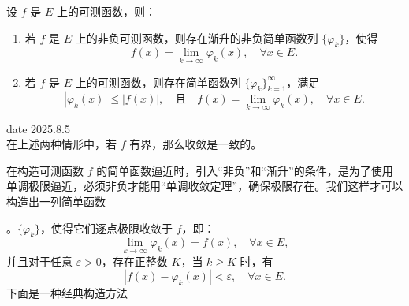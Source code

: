 \documentclass[lang=cn,10pt]{elegantbook}
\begin{document}
\begin{theorem}[可测函数是简单函数的极限]
设 $f$ 是 $E$ 上的可测函数，则：

\begin{enumerate}[(1)]
    \item 若 $f$ 是 $E$ 上的非负可测函数，则存在渐升的非负简单函数列 $\{\varphi_k\}$，使得
    \[
    f(x) = \lim_{k \to \infty} \varphi_k(x), \quad \forall x \in E.
    \]

    \item 若 $f$ 是 $E$ 上的可测函数，则存在简单函数列 $\{\varphi_k\}_{k=1}^\infty$，满足
    \[
    |\varphi_k(x)| \leq |f(x)|, \quad \text{且} \quad f(x) = \lim_{k \to \infty} \varphi_k(x), \quad \forall x \in E.
    \]
\end{enumerate}
date 2025.8.5\\
在上述两种情形中，若 $f$ 有界，那么收敛是一致的。
\end{theorem}
\begin{dxtips}
    

    
在构造可测函数 $f$ 的简单函数逼近时，引入“非负”和“渐升”的条件，是为了使用单调极限逼近，必须非负才能用“单调收敛定理”，确保极限存在。我们这样才可以构造出一列简单函数
\end{dxtips}
 。$\{\varphi_k\}$，使得它们逐点极限收敛于 $f$，即：
\[
\lim_{k \to \infty} \varphi_k(x) = f(x), \quad \forall x \in E,
\]
并且对于任意 $\varepsilon > 0$，存在正整数 $K$，当 $k \geq K$ 时，有
\[
|f(x) - \varphi_k(x)| < \varepsilon, \quad \forall x \in E.
\]
下面是一种经典构造方法
\end{document}
